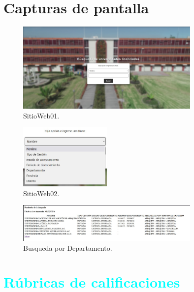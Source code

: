 \documentclass{article}
\begin{document}
    \section{Capturas de pantalla}
    \begin{figure}[ht]
        \centering
        \includegraphics[width=0.8\textwidth]{img1.jpg}
        \caption{SitioWeb01.}
        \label{fig:img1}
    \end{figure}
    
    \begin{figure}[ht]
        \centering
        \includegraphics[width=0.4\textwidth]{img2.jpg}
        \caption{SitioWeb02.}
        \label{fig:img2}
    \end{figure}
    
    \begin{figure}[ht]
        \centering
        \includegraphics[width=0.8\textwidth]{img3.jpg}
        \caption{Busqueda por Departamento.}
        \label{fig:img3}
    \end{figure}
    
    \newpage
	\section{\textcolor{cyan}{Rúbricas de calificaciones}}
	
\end{document}
